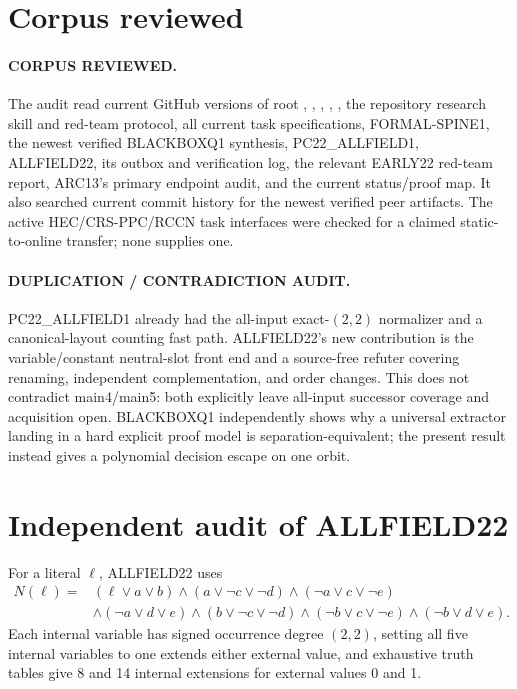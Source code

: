 \documentclass[11pt]{article}
\begin{document}
\section{Corpus reviewed}
\paragraph{CORPUS REVIEWED.}
The audit read current GitHub versions of root ,
, , , , the
repository research skill and red-team protocol, all current task
specifications, FORMAL-SPINE1, the newest verified BLACKBOXQ1 synthesis,
PC22\_ALLFIELD1, ALLFIELD22, its outbox and verification log, the relevant
EARLY22 red-team report, ARC13's primary endpoint audit, and the current
status/proof map.  It also searched current commit history for the newest
verified peer artifacts.  The active HEC/CRS-PPC/RCCN task interfaces were
checked for a claimed static-to-online transfer; none supplies one.

\paragraph{DUPLICATION / CONTRADICTION AUDIT.}
PC22\_ALLFIELD1 already had the all-input exact-$(2,2)$ normalizer and a
canonical-layout counting fast path.  ALLFIELD22's new contribution is the
variable/constant neutral-slot front end and a source-free refuter covering
renaming, independent complementation, and order changes.  This does not
contradict main4/main5: both explicitly leave all-input successor coverage
and acquisition open.  BLACKBOXQ1 independently shows why a universal
extractor landing in a hard explicit proof model is separation-equivalent;
the present result instead gives a polynomial decision escape on one orbit.

\section{Independent audit of ALLFIELD22}
For a literal $\ell$, ALLFIELD22 uses
\begin{align*}
N(\ell)={}&(\ell\vee a\vee b)\wedge(a\vee\neg c\vee\neg d)
\wedge(\neg a\vee c\vee\neg e)\\
&\wedge(\neg a\vee d\vee e)\wedge(b\vee\neg c\vee\neg d)
\wedge(\neg b\vee c\vee\neg e)\wedge(\neg b\vee d\vee e).
\end{align*}
Each internal variable has signed occurrence degree $(2,2)$, setting all
five internal variables to one extends either external value, and exhaustive
truth tables give 8 and 14 internal extensions for external values 0 and 1.
\end{document}
